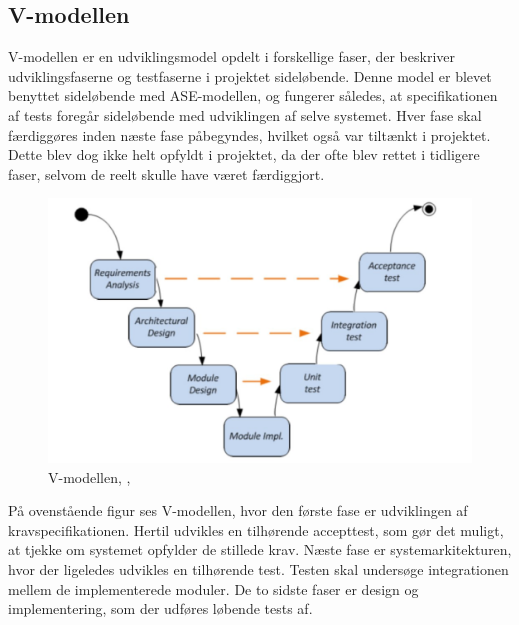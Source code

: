 \subsection{V-modellen}
V-modellen er en udviklingsmodel opdelt i forskellige faser, der beskriver udviklingsfaserne og testfaserne i projektet sideløbende. Denne model er blevet benyttet sideløbende med ASE-modellen, og fungerer således, at specifikationen af tests foregår sideløbende med udviklingen af selve systemet. Hver fase skal færdiggøres inden næste fase påbegyndes, hvilket også var tiltænkt i projektet. Dette blev dog ikke helt opfyldt i projektet, da der ofte blev rettet i tidligere faser, selvom de reelt skulle have været færdiggjort.
\begin{figure}[H]
	\centering
	\includegraphics[width=1\textwidth]{Figurer/vmodel}
	\caption{V-modellen, \protect\cite[s. 4]{Vejledning}, \protect\cite{ISE}}
\end{figure}
På ovenstående figur ses V-modellen, hvor den første fase er udviklingen af kravspecifikationen. Hertil udvikles en tilhørende accepttest, som gør det muligt, at tjekke om systemet opfylder de stillede krav. Næste fase er systemarkitekturen, hvor der ligeledes udvikles en tilhørende test. Testen skal undersøge integrationen mellem de implementerede moduler. De to sidste faser er design og implementering, som der udføres løbende tests af. 

